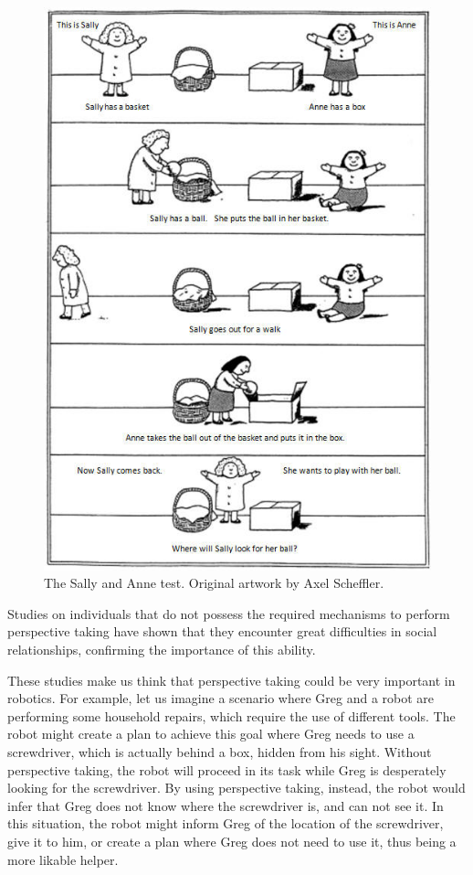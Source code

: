  \begin{figure}[ht!]
	\centering
	\includegraphics[scale=0.45]{img/observer/sally-anne.jpg}
	\caption{The Sally and Anne test. Original artwork by Axel Scheffler.}
	\label{fig:belief_management-sally_anne}
\end{figure}

Studies on individuals that do not possess the required mechanisms to perform perspective taking \citep{frick2014picturing} have shown that they encounter great difficulties in social relationships, confirming the importance of this ability.

These studies make us think that perspective taking could be very important in robotics. For example, let us imagine a scenario where Greg and a robot are performing some household repairs, which require the use of different tools. The robot might create a plan to achieve this goal where Greg needs to use a screwdriver, which is actually behind a box, hidden from his sight. Without perspective taking, the robot will proceed in its task while Greg is desperately looking for the screwdriver. By using perspective taking, instead, the robot would infer that Greg does not know where the screwdriver is, and can not see it. In this situation, the robot might inform Greg of the location of the screwdriver, give it to him, or create a plan where Greg does not need to use it, thus being a more likable helper.

